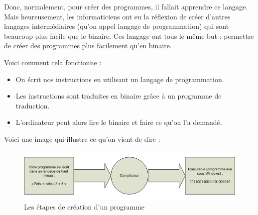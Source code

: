 \documentclass[12pt]{article}
\begin{document}
            Donc, normalement, pour créer des programmes, il fallait apprendre ce langage.
            Mais heureusement, les informaticiens ont eu la réflexion de créer d'autres langages intermédiaires 
            (qu'on appel langage de programmation) qui sont beaucoup plus facile que le binaire. Ces langage ont 
            tous le même but : permettre de créer des programmes plus facilement qu'en binaire.
            
            Voici comment cela fonctionne :
            \begin{itemize}
                \item On écrit nos instructions en utilisant un langage de programmation.
                \item Les instructions sont traduites en binaire grâce à un programme de traduction.
                \item L'ordinateur peut alors lire le binaire et faire ce qu'on l'a demandé.
            \end{itemize}

            Voici une image qui illustre ce qu'on vient de dire :
            \begin{figure}[H]
                \centering
                \includegraphics[width=\linewidth]{img/11_compilation.png}
                \caption{Les étapes de création d'un programme}
            \end{figure}

\end{document}
